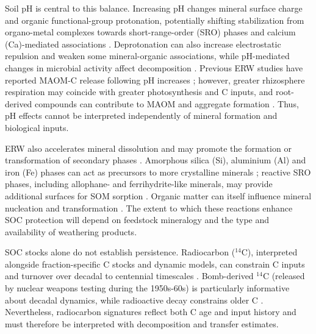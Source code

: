 \documentclass[preprint,12pt]{elsarticle}
\begin{document}
Soil pH is central to this balance. Increasing pH changes mineral surface charge and organic functional-group protonation, potentially shifting stabilization from organo-metal complexes towards short-range-order (SRO) phases and calcium (Ca)-mediated associations 
\citep{zhou2024global,Rasmussen2018,jiang2026molecular}. Deprotonation can also increase electrostatic repulsion and weaken some mineral-organic associations, while pH-mediated changes in microbial activity affect decomposition 
\citep{jiang2026molecular,Wang2024}. Previous ERW studies have reported MAOM-C release following pH increases 
\citep{steinwidder2025beyond}; however, greater rhizosphere respiration may coincide with greater photosynthesis and C inputs, and root-derived compounds can contribute to MAOM and aggregate formation \citep{Leuthold2026,Sokol2022,Kuzyakov2001,kleber2021dynamic}. Thus, pH effects cannot be interpreted independently of mineral formation and biological inputs.

ERW also accelerates mineral dissolution and may promote the formation or transformation of secondary phases 
\citep{Andrews2019,steinwidder2025beyond}. Amorphous silica (Si), aluminium (Al) and iron (Fe) phases can act as precursors to more crystalline minerals 
\citep{Behrens2015}; reactive SRO phases, including allophane- and ferrihydrite-like minerals, may provide additional surfaces for SOM sorption 
\citep{sokol2024reduced,steinwidder2025beyond}. Organic matter can itself influence mineral nucleation and transformation 
\citep{kleber2021dynamic}. The extent to which these reactions enhance SOC protection will depend on feedstock mineralogy and the type and availability of weathering products.

SOC stocks alone do not establish persistence. Radiocarbon ($^{14}$C), interpreted alongside fraction-specific C stocks and dynamic models, can constrain C inputs and turnover over decadal to centennial timescales 
\citep{sierra2021climate,xia2013traceable,sierra2014radiocarbon,mills2014longterm}. Bomb-derived $^{14}$C (released by nuclear weapons testing during the 1950s-60s) is particularly informative about decadal dynamics, while radioactive decay constrains older C 
\citep{mills2014longterm}. Nevertheless, radiocarbon signatures reflect both C age and input history and must therefore be interpreted with decomposition and transfer estimates.
\end{document}
